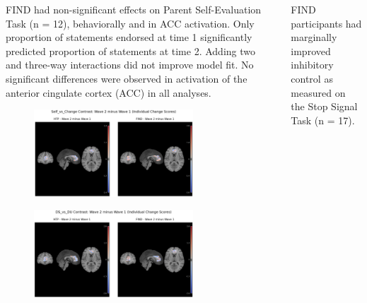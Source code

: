 \documentclass[final]{beamer}
\newlength{\sepwidth}
\newlength{\colwidth}
\newcommand{\separatorcolumn}{\begin{column}{\sepwidth}\end{column}}
\begin{document}
\begin{frame}[t]
\begin{columns}[t]
\begin{column}{\colwidth}
\begin{block}{FIND had non-significant effects on Parent Self-Evaluation Task (n = 12), behaviorally and in ACC activation.}
    Only proportion of statements endorsed at time 1 significantly predicted proportion of statements at time 2. Adding two and three-way interactions did not improve model fit. No significant differences were observed in activation of the anterior cingulate cortex (ACC) in all analyses.

    \vspace{-0.35cm}
    \begin{figure}[ht]
      \centering
      \includegraphics[clip, width=0.8\textwidth]{acc_selfchange.png}
      \label{fig:pset_selfchange}
    \end{figure}
    \vspace{-0.65cm}
    \begin{figure}[ht]
      \centering
      \includegraphics[clip, width=0.8\textwidth]{acc_dsdu.png}
      \label{fig:acc_dsdu}
    \end{figure}
  \end{block}

\end{column}

\separatorcolumn

\begin{column}{\colwidth}
    
      \begin{block}{FIND participants had marginally improved inhibitory control as measured on the Stop Signal Task (n = 17).}


\end{block}
\end{column}
\end{columns}
\end{frame}
\end{document}
